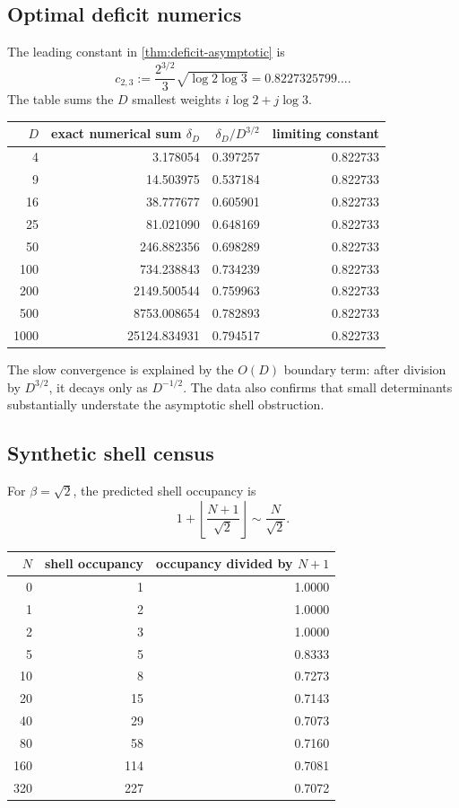 \documentclass[10pt,oneside]{article}
\theoremstyle{definition}
\theoremstyle{remark}
\begin{document}
\subsection{Optimal deficit numerics}
The leading constant in \cref{thm:deficit-asymptotic} is
\[
 c_{2,3}:=\frac{2^{3/2}}3\sqrt{\log2\log3}
 =0.8227325799\ldots.
\]
The table sums the \(D\) smallest weights \(i\log2+j\log3\).

\begin{center}
\begin{tabular}{r r r r}
\toprule
\(D\) & exact numerical sum \(\delta_D\) & \(\delta_D/D^{3/2}\) & limiting constant \\
\midrule
4    & 3.178054  & 0.397257 & 0.822733 \\
9    & 14.503975 & 0.537184 & 0.822733 \\
16   & 38.777677 & 0.605901 & 0.822733 \\
25   & 81.021090 & 0.648169 & 0.822733 \\
50   & 246.882356 & 0.698289 & 0.822733 \\
100  & 734.238843 & 0.734239 & 0.822733 \\
200  & 2149.500544 & 0.759963 & 0.822733 \\
500  & 8753.008654 & 0.782893 & 0.822733 \\
1000 & 25124.834931 & 0.794517 & 0.822733 \\
\bottomrule
\end{tabular}
\end{center}

The slow convergence is explained by the \(O(D)\) boundary term: after division by \(D^{3/2}\), it decays only as \(D^{-1/2}\).  The data also confirms that small determinants substantially understate the asymptotic shell obstruction.

\subsection{Synthetic shell census}
For \(\beta=\sqrt2\), the predicted shell occupancy is
\[
 1+\left\lfloor\frac{N+1}{\sqrt2}\right\rfloor
 \sim \frac N{\sqrt2}.
\]

\begin{center}
\begin{tabular}{r r r}
\toprule
\(N\) & shell occupancy & occupancy divided by \(N+1\) \\
\midrule
0 & 1 & 1.0000 \\
1 & 2 & 1.0000 \\
2 & 3 & 1.0000 \\
5 & 5 & 0.8333 \\
10 & 8 & 0.7273 \\
20 & 15 & 0.7143 \\
40 & 29 & 0.7073 \\
80 & 58 & 0.7160 \\
160 & 114 & 0.7081 \\
320 & 227 & 0.7072 \\
\bottomrule
\end{tabular}
\end{center}
\end{document}
